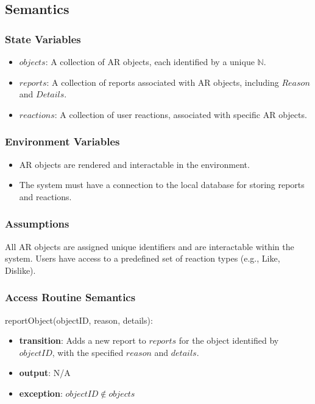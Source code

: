 \documentclass[12pt, titlepage]{article}
\begin{document}
\subsection{Semantics}

\subsubsection{State Variables}

\begin{itemize}
  \item \( objects \): A collection of AR objects, each identified by a unique \( \mathbb{N} \).
  \item \( reports \): A collection of reports associated with AR objects, including \( Reason \) and \( Details \).
  \item \( reactions \): A collection of user reactions, associated with specific AR objects.
\end{itemize}

\subsubsection{Environment Variables}

\begin{itemize}
  \item AR objects are rendered and interactable in the environment.
  \item The system must have a connection to the local database for storing reports and reactions.
\end{itemize}

\subsubsection{Assumptions}

All AR objects are assigned unique identifiers and are interactable within the system. Users have access to a predefined set of reaction types (e.g., Like, Dislike).

\subsubsection{Access Routine Semantics}

\noindent reportObject(objectID, reason, details):
\begin{itemize}
  \item \textbf{transition}:
        Adds a new report to \( reports \) for the object identified by \( objectID \), with the specified \( reason \) and \( details \).
  \item \textbf{output}: N/A
  \item \textbf{exception}: \( objectID \notin objects \)
\end{itemize}
\end{document}
